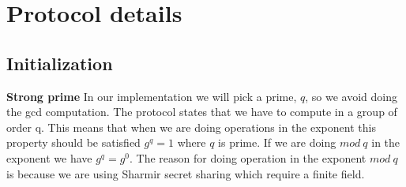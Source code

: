 \section{Protocol details}

\subsection{Initialization}
\noindent
\textbf{Strong prime} In our implementation we will pick a prime, \begin{math}q\end{math}, so we avoid doing the gcd computation. The protocol states that we have to compute in a group of order q. This means that when we are doing operations in the exponent this property should be satisfied \begin{math}g^q=1\end{math} where \begin{math}q\end{math} is prime. If we are doing \begin{math}mod \ q \end{math} in the exponent we have \begin{math}g^q=g^0\end{math}. The reason for doing operation in the exponent \begin{math}mod \ q\end{math} is because we are using Sharmir secret sharing which require a finite field.\\

